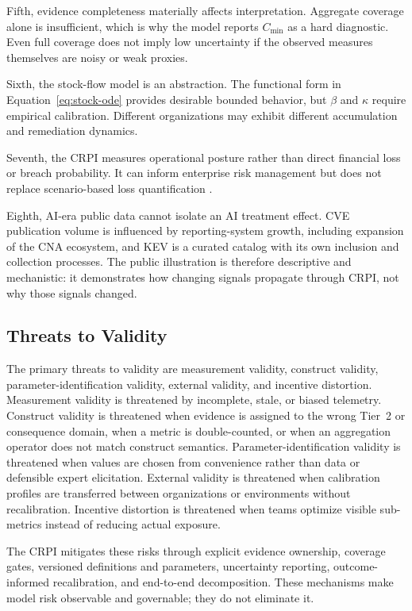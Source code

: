\documentclass[11pt]{article}
\begin{document}
Fifth, evidence completeness materially affects interpretation. Aggregate coverage
alone is insufficient, which is why the model reports $C_{\min}$ as a hard diagnostic.
Even full coverage does not imply low uncertainty if the observed measures themselves
are noisy or weak proxies.

Sixth, the stock-flow model is an abstraction. The functional form in
Equation~\ref{eq:stock-ode} provides desirable bounded behavior, but $\beta$ and
$\kappa$ require empirical calibration. Different organizations may exhibit different
accumulation and remediation dynamics.

Seventh, the CRPI measures operational posture rather than direct financial loss or
breach probability. It can inform enterprise risk management but does not replace
scenario-based loss quantification \cite{gordon-loeb,biener-eling-wirfs}.

Eighth, AI-era public data cannot isolate an AI treatment effect. CVE publication volume
is influenced by reporting-system growth, including expansion of the CNA ecosystem, and
KEV is a curated catalog with its own inclusion and collection processes. The public
illustration is therefore descriptive and mechanistic: it demonstrates how changing
signals propagate through CRPI, not why those signals changed.

\subsection{Threats to Validity}
The primary threats to validity are measurement validity, construct validity,
parameter-identification validity, external validity, and incentive distortion.
Measurement validity is threatened by incomplete, stale, or biased telemetry.
Construct validity is threatened when evidence is assigned to the wrong Tier~2 or
consequence domain, when a metric is double-counted, or when an aggregation operator
does not match construct semantics. Parameter-identification validity is threatened
when values are chosen from convenience rather than data or defensible expert
elicitation. External validity is threatened when calibration profiles are transferred
between organizations or environments without recalibration. Incentive distortion is
threatened when teams optimize visible sub-metrics instead of reducing actual exposure.

The CRPI mitigates these risks through explicit evidence ownership, coverage gates,
versioned definitions and parameters, uncertainty reporting, outcome-informed
recalibration, and end-to-end decomposition. These mechanisms make model risk
observable and governable; they do not eliminate it.
\end{document}
